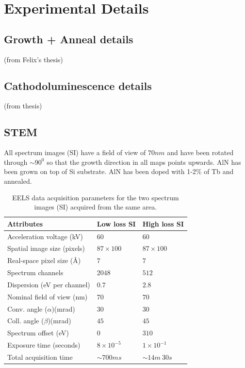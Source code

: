 \documentclass[%
 aip,
rsi,%
 amsmath,amssymb,
 reprint,%
]{revtex4-1}
\begin{document}
\section{Experimental Details}
\label{sec:exp_detail}

\subsection{Growth + Anneal details}
\label{sec:growth}
(from Felix's thesis)

\subsection{Cathodoluminescence details}
\label{sec:CL}
(from thesis)

\subsection{STEM}
\label{sec:STEM}
All spectrum images (SI) have a field of view of $70nm$ and have been rotated through $\sim90^0$ so that the growth direction in all maps points upwards. AlN has been grown on top of Si substrate. AlN has been doped with 1-2\% of Tb and annealed.
\begin{table}
	\caption{EELS data acquisition parameters for the two spectrum 	images (SI) acquired from the same area.}
    \label{tab:Attributes}
	\begin{ruledtabular}
		\begin{tabular}{lll}
			Attributes&Low loss SI&High loss SI							\\ \hline
            Acceleration voltage (kV) &$60$&$60$						\\
			Spatial image size (pixels)&$87\times100$&$87\times100$ 	\\
            Real-space pixel size (\AA)&$7$&$7$							\\
            Spectrum channels		&$2048$&$512$						\\
			Dispersion (eV per channel)&$0.7$&$2.8$						\\
			Nominal field of view (nm) &$70$&$70$						\\
			Conv. angle ($\alpha$)(mrad)&$30$&$30$						\\
			Coll. angle ($\beta$)(mrad)&$45$&$45$						\\
			Spectrum offset (eV)&$0$&$310$								\\
			Exposure time (seconds)&$8\times10^{-5}$&$1\times10^{-1}$	\\
			Total acquisition time &$\sim700ms$&$\sim14m~30s$
		\end{tabular}
	\end{ruledtabular}
\end{table}
\end{document}

